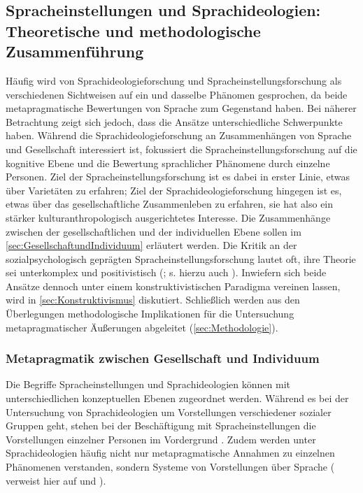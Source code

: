 \subsection{Spracheinstellungen und Sprachideologien: Theoretische und methodologische Zusammenführung}
\label{sec:Integrationsversuch}
\begin{sloppypar}
Häufig wird von Sprachideologieforschung und Spracheinstellungsforschung als verschiedenen Sichtweisen auf ein und dasselbe Phänomen gesprochen, da beide metapragmatische Bewertungen von Sprache zum Gegenstand haben. 
Bei näherer Betrachtung zeigt sich jedoch, dass die Ansätze unterschiedliche Schwerpunkte haben. 
Während die Sprachideologieforschung an Zusammenhängen von Sprache und Gesellschaft interessiert ist, fokussiert die Spracheinstellungsforschung auf die kognitive Ebene und die Bewertung sprachlicher Phänomene durch einzelne Personen. 
Ziel der Spracheinstellungsforschung ist es dabei in erster Linie, etwas über Varietäten zu erfahren; 
Ziel der Sprachideologieforschung hingegen ist es, etwas über das gesellschaftliche Zusammenleben zu erfahren, sie hat also ein stärker kulturanthropologisch ausgerichtetes Interesse. 
Die Zusammenhänge zwischen der gesellschaftlichen und der individuellen Ebene sollen im \autoref{sec:GesellschaftundIndividuum} erläutert werden. 
Die Kritik an der sozialpsychologisch geprägten Spracheinstellungsforschung lautet oft, ihre Theorie sei unterkomplex und positivistisch (\citealp[s. etwa][141]{Agheyisi.1970}; s. hierzu auch \citealp{Soukup.2014}). 
Inwiefern sich beide Ansätze dennoch unter einem konstruktivistischen Paradigma vereinen lassen, wird in \autoref{sec:Konstruktivismus} diskutiert. 
Schließlich werden aus den Überlegungen methodologische Implikationen für die Untersuchung metapragmatischer Äußerungen abgeleitet (\autoref{sec:Methodologie}). 
\end{sloppypar}
\subsubsection{Metapragmatik zwischen Gesellschaft und Individuum}
\label{sec:GesellschaftundIndividuum}
Die Begriffe Spracheinstellungen und Sprachideologien können mit \citet[22]{Konig.2014} unterschiedlichen konzeptuellen Ebenen zugeordnet werden. 
Während es bei der Untersuchung von Sprachideologien um Vorstellungen verschiedener sozialer Gruppen geht, stehen bei der Beschäftigung mit Spracheinstellungen die Vorstellungen einzelner Personen im Vordergrund \citep[s.][24]{Konig.2014}.
Zudem werden unter Sprachideologien h{\"a}ufig nicht nur metapragmatische Annahmen zu einzelnen Ph{\"a}nomenen verstanden, sondern Systeme von Vorstellungen {\"u}ber Sprache (\citealp[24]{Konig.2014} verweist hier auf \citealp[970]{Gal.1995} und \citealp[35]{Irvine2000}).

